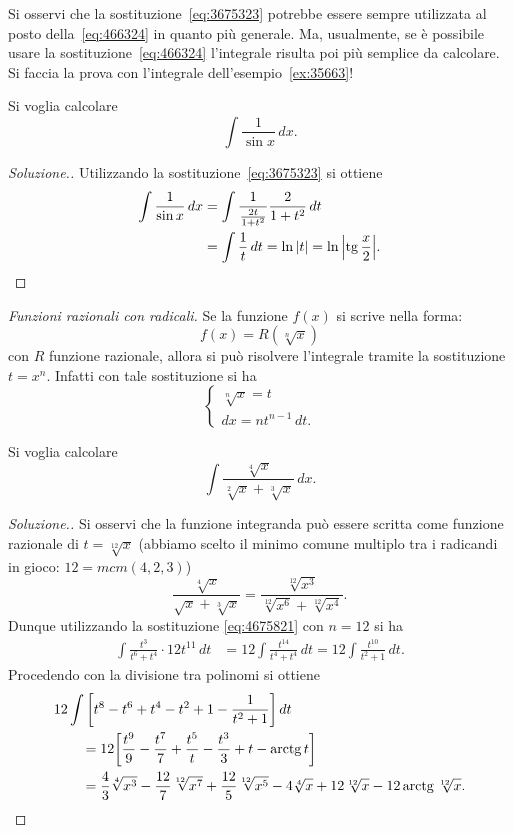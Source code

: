 \begin{remark}
Si osservi che la sostituzione~\eqref{eq:3675323} potrebbe essere
sempre utilizzata al posto della~\eqref{eq:466324} in quanto più generale.
Ma, usualmente, se è possibile usare la sostituzione~\eqref{eq:466324}
l'integrale risulta
poi più semplice da calcolare. Si faccia la prova con l'integrale
dell'esempio~\ref{ex:35663}!
\end{remark}

\begin{example}
Si voglia calcolare
\[
 \int \frac{1}{\sin x}\, dx.
\]
\end{example}
\begin{proof}[Soluzione.]
Utilizzando la sostituzione~\eqref{eq:3675323}
si ottiene
\begin{align*}
  \int \frac{1}{\sin x}\, dx
  &= \int \frac{1}{\frac{2t}{1+t^2}}\frac{2}{1+t^2}\, dt \\
  &= \int \frac{1}{t}\, dt = \ln{\left|t\right|} = \ln {\left|\operatorname{tg}\frac x 2\right|}.
\end{align*}
\end{proof}

\emph{Funzioni razionali con radicali.}
Se la funzione $f(x)$ si scrive nella forma:
\[
  f(x) = R(\sqrt[n] x)
\]
con $R$ funzione razionale, allora si può risolvere l'integrale tramite
la sostituzione $t = x^n$. Infatti con tale sostituzione si ha
\begin{equation}\label{eq:4675821}
\begin{cases}
  \sqrt[n] x = t\\
  dx = n t^{n-1}\, dt.
\end{cases}
\end{equation}

\begin{example}
Si voglia calcolare
\[
  \int \frac{\sqrt[4]{x}}{\sqrt[2]{x} + \sqrt[3]{x}}\, dx.
\]
\end{example}
\begin{proof}[Soluzione.]
Si osservi che la funzione integranda può essere scritta
come funzione razionale di $t=\sqrt[12]{x}$ (abbiamo scelto
il minimo comune multiplo tra i radicandi in gioco: $12 = mcm(4,2,3)$)
\[
  \frac{\sqrt[4]{x}}{\sqrt{x} + \sqrt[3]{x}}
  = \frac{\sqrt[12]{x^3}}{\sqrt[12]{x^6} + \sqrt[12]{x^4}}.
\]
Dunque utilizzando la sostituzione \eqref{eq:4675821} con $n=12$ si ha
\begin{align*}
\int \frac{t^3}{t^6 + t^4}\cdot 12 t^{11}\, dt
&= 12 \int \frac{t^{14}}{t^4+t^4}\, dt
 = 12 \int \frac{t^{10}}{t^2+1}\, dt.
\end{align*}
Procedendo con la divisione tra polinomi si ottiene
\begin{align*}
\MoveEqLeft{12 \int \Enclose{t^8 - t^6 + t^4 - t^2 + 1 - \frac{1}{t^2+1}}\, dt} \\
&= 12 \Enclose{\frac{t^9}{9} - \frac{t^7}{7} + \frac{t^5}{t} - \frac{t^3}{3} + t - \arctg t} \\
&= \frac 4 3 \sqrt[4]{x^3} - \frac{12}{7}\sqrt[12]{x^7}
+ \frac{12}{5}\sqrt[12]{x^5} - 4 \sqrt[4]{x} + 12 \sqrt[12]{x} - 12 \arctg \sqrt[12]{x}.
\end{align*}
\end{proof}

